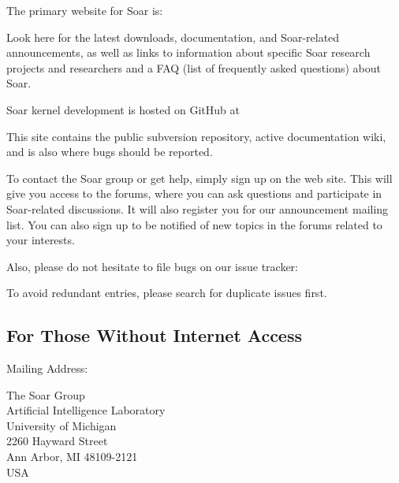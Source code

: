 The primary website for Soar is:

\hspace{2em}

Look here for the latest downloads, documentation, and Soar-related announcements, as well
as links to information about specific Soar research projects and researchers and a FAQ
(list of frequently asked questions) about Soar.

Soar kernel development is hosted on GitHub at

\hspace{2em}

This site contains the public subversion repository, active
documentation wiki, and is also where bugs should be reported.

To contact the Soar group or get help, simply sign up on the web site.  
This will give you access to the forums, where you can ask questions and 
participate in Soar-related discussions.  It will also register you
for our announcement mailing list.  You can also sign up to be notified
of new topics in the forums related to your interests.

Also, please do not hesitate to file bugs on our issue tracker:

\hspace{2em}

To avoid redundant entries, please search for duplicate issues first.
\newpage
\subsection*{For Those Without Internet Access}

Mailing Address:

\begin{flushleft}
\hspace{2em}The Soar Group \\
\hspace{2em}Artificial Intelligence Laboratory \\
\hspace{2em}University of Michigan\\
\hspace{2em}2260 Hayward Street\\
\hspace{2em}Ann Arbor, MI 48109-2121 \\
\hspace{2em}USA \\
\end{flushleft}

